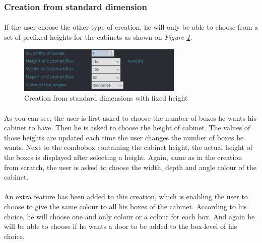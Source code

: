 \documentclass[12pt,oneside]{report}
\begin{document}
        \newpage
        \subsubsection{Creation from standard dimension}
            \paragraph{}
            If the user choose the other type of creation, he will only be able to choose from a set of prefixed heights for the cabinets as shown on \textit{Figure \ref{fig:fixedheight}}. 
            \vspace{\baselineskip}
            
            \begin{figure}[h!]
                \centering
    			\includegraphics[width = 0.7\textwidth]{Figures/boxHeight.PNG}
    			\caption{Creation from standard dimensions with fixed height}
    			\label{fig:fixedheight}
    		\end{figure}
            
            \paragraph{}
            As you can see, the user is first asked to choose the number of boxes he wants his cabinet to have.  Then he is asked to choose the height of cabinet. The values of those heights are updated each time the user changes the number of boxes he wants. Next to the combobox containing the cabinet height, the actual height of the boxes is displayed after selecting a height. Again, same as in the creation from scratch, the user is asked to choose the width, depth and angle colour of the cabinet. 
            
            \paragraph{}
            An extra feature has been added to this creation, which is enabling the user to choose to give the same colour to all his boxes of the cabinet. According to his choice, he will choose one and only colour or a colour for each box. And again he will be able to choose if he wants a door to be added to the box-level of his choice. 
            
\end{document}
